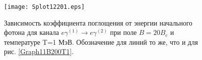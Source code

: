 \begin{figure}[t!]\centering
	\texttt{[image: Splot12201.eps]}
	\caption{Зависимость коэффициента поглощения от энергии начального фотона для канала $e\gamma^{(1)}\to e\gamma^{(2)}$ при поле $B=20 B_e$ и температуре T=1 МэВ. Обозначение для линий то же, что и для рис. \ref{Graph11B200T1}.}
	\label{Graph12B20T1}
\end{figure}
\clearpage
